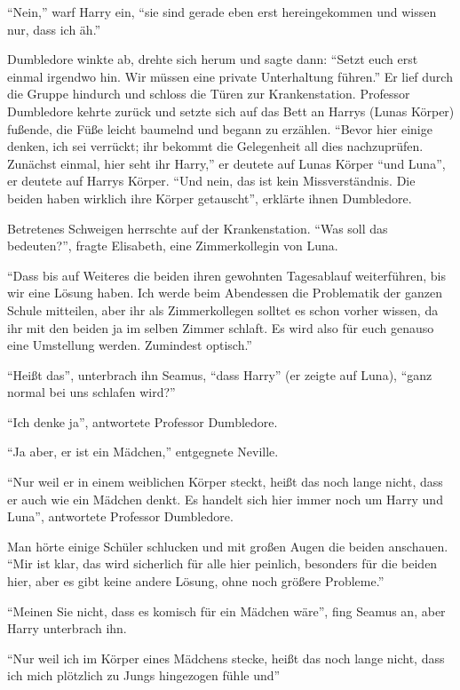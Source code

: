 \enquote{Nein,} warf Harry ein, \enquote{sie sind gerade eben erst hereingekommen und wissen nur, dass ich \gst äh.}

Dumbledore winkte ab, drehte sich herum und sagte dann: \enquote{Setzt euch erst einmal irgendwo hin. Wir müssen eine private Unterhaltung führen.} Er lief durch die Gruppe hindurch und schloss die Türen zur Krankenstation. Professor Dumbledore kehrte zurück und setzte sich auf das Bett an Harrys (Lunas Körper) fußende, die Füße leicht baumelnd und begann zu erzählen. \enquote{Bevor hier einige denken, ich sei verrückt; ihr bekommt die Gelegenheit all dies nachzuprüfen. \gst Zunächst einmal, hier seht ihr Harry,} er deutete auf Lunas Körper \enquote{und Luna}, er deutete auf Harrys Körper. \enquote{Und nein, das ist kein Missverständnis. Die beiden haben wirklich ihre Körper getauscht}, erklärte ihnen Dumbledore.

Betretenes Schweigen herrschte auf der Krankenstation. \enquote{Was soll das bedeuten?}, fragte Elisabeth, eine Zimmerkollegin von Luna.

\enquote{Dass bis auf Weiteres die beiden ihren gewohnten Tagesablauf weiterführen, bis wir eine Lösung haben. Ich werde beim Abendessen die Problematik der ganzen Schule mitteilen, aber ihr als Zimmerkollegen solltet es schon vorher wissen, da ihr mit den beiden ja im selben Zimmer schlaft. Es wird also für euch genauso eine Umstellung werden. Zumindest optisch.}

\enquote{Heißt das}, unterbrach ihn Seamus, \enquote{dass Harry} (er zeigte auf Luna), \enquote{ganz normal bei uns schlafen wird?}

\enquote{Ich denke ja}, antwortete Professor Dumbledore.

\enquote{Ja aber, er ist ein Mädchen,} entgegnete Neville.

\enquote{Nur weil er in einem weiblichen Körper steckt, heißt das noch lange nicht, dass er auch wie ein Mädchen denkt. Es handelt sich hier immer noch um Harry und Luna}, antwortete Professor Dumbledore.

Man hörte einige Schüler schlucken und mit großen Augen die beiden anschauen. \enquote{Mir ist klar, das wird sicherlich für alle hier peinlich, besonders für die beiden hier, aber es gibt keine andere Lösung, ohne noch größere Probleme.}

\enquote{Meinen Sie nicht, dass es komisch für ein Mädchen wäre\abs}, fing Seamus an, aber Harry unterbrach ihn.

\enquote{Nur weil ich im Körper eines Mädchens stecke, heißt das noch lange nicht, dass ich mich plötzlich zu Jungs hingezogen fühle und\abs}

